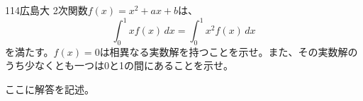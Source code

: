 \begin{prob}{114}{}{広島大}
 2次関数$f(x)=x^2+ax+b$は、
 \[ \int_0^1\! xf(x) \,dx = \int_0^1\! x^2f(x) \,dx \]
 を満たす。$f(x)=0$は相異なる実数解を持つことを示せ。また、その実数解のうち少なくとも一つは0と1の間にあることを示せ。
\end{prob}
ここに解答を記述。